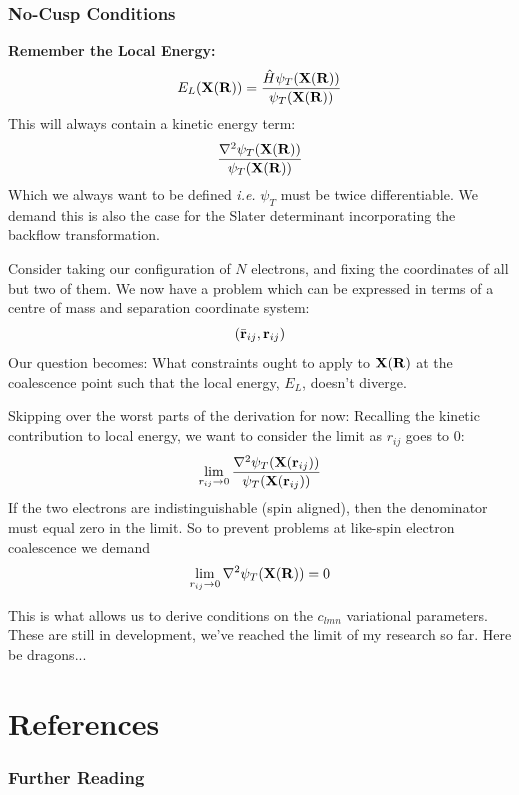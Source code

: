 \documentclass[10pt]{beamer}
\begin{document}
\begin{frame}[allowframebreaks]
    \frametitle{No-Cusp Conditions}
    \textbf{Remember the Local Energy:}
    \begin{equation}
        E_L\pqty{\vb{X}\pqty{\vb{R}}}=\frac{
            \hat{H}\psi_T\pqty{\vb{X}\pqty{\vb{R}}}
        }{
            \psi_T\pqty{\vb{X}\pqty{\vb{R}}}
        }
    \end{equation}
    This will always contain a kinetic energy term:
    \begin{equation}
        \frac{
            \laplacian\psi_T\pqty{\vb{X}\pqty{\vb{R}}}
        }{
            \psi_T\pqty{\vb{X}\pqty{\vb{R}}}
        }
    \end{equation}
    Which we always want to be defined \textit{i.e.} $\psi_T$ must be twice
    differentiable. We demand this is also the case for the Slater determinant
    incorporating the backflow transformation.
    \framebreak

    Consider taking our configuration of $N$ electrons, and fixing the
    coordinates of all but two of them. We now have a problem which can be
    expressed in terms of a centre of mass and separation coordinate system:
    \begin{equation*}
        \pqty{\bar{\vb{r}}_{ij},\vb{r}_{ij}}
    \end{equation*}
    Our question becomes: What constraints ought to apply to
    $\vb{X}\pqty{\vb{R}}$ at the coalescence point such that the local energy,
    $E_L$, doesn't diverge.
    \framebreak

    Skipping over the worst parts of the derivation for now:\newline
    Recalling the kinetic contribution to local energy, we want to consider
    the limit as $r_{ij}$ goes to $0$:
    \begin{equation}
        \lim\limits_{r_{ij}\to 0}\frac{
            \laplacian\psi_T\pqty{\vb{X}\pqty{\vb{r}_{ij}}}
        }{
            \psi_T\pqty{\vb{X}\pqty{\vb{r}_{ij}}}
        }
    \end{equation}
    If the two electrons are indistinguishable (spin aligned), then the
    denominator must equal zero in the limit.\medskip\newline
    So to prevent problems at like-spin electron coalescence we demand
    \begin{equation}
        \lim\limits_{r_{ij}\to 0}\laplacian\psi_T\pqty{\vb{X}\pqty{\vb{R}}}=0
    \end{equation}
    \framebreak

    This is what allows us to derive conditions on the $c_{lmn}$ variational
    parameters. These are still in development, we've reached the limit of my
    research so far.\medskip\newline
    Here be dragons...
\end{frame}


\section{References}
\begin{frame}[allowframebreaks]
    \frametitle{Further Reading}
    
    

\end{frame}
\end{document}
